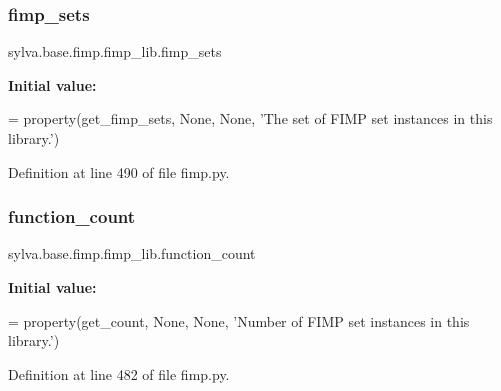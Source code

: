 \subsubsection{\texorpdfstring{fimp\+\_\+sets}{fimp\_sets}}
{\footnotesize\ttfamily sylva.\+base.\+fimp.\+fimp\+\_\+lib.\+fimp\+\_\+sets\hspace{0.3cm}{\ttfamily [static]}}

{\bfseries Initial value\+:}
\begin{DoxyCode}
=  property(get\_fimp\_sets, \textcolor{keywordtype}{None}, \textcolor{keywordtype}{None},
      \textcolor{stringliteral}{'The set of FIMP set instances in this library.'})
\end{DoxyCode}


Definition at line 490 of file fimp.\+py.

\mbox{\label{classsylva_1_1base_1_1fimp_1_1fimp__lib_af017d651d8249d243476a42a52d71b61}} 
\subsubsection{\texorpdfstring{function\+\_\+count}{function\_count}}
{\footnotesize\ttfamily sylva.\+base.\+fimp.\+fimp\+\_\+lib.\+function\+\_\+count\hspace{0.3cm}{\ttfamily [static]}}

{\bfseries Initial value\+:}
\begin{DoxyCode}
=  property(get\_count, \textcolor{keywordtype}{None}, \textcolor{keywordtype}{None},
      \textcolor{stringliteral}{'Number of FIMP set instances in this library.'})
\end{DoxyCode}


Definition at line 482 of file fimp.\+py.

\mbox{\label{classsylva_1_1base_1_1fimp_1_1fimp__lib_a49bd10a263150c845e87e4134d893e84}} 
